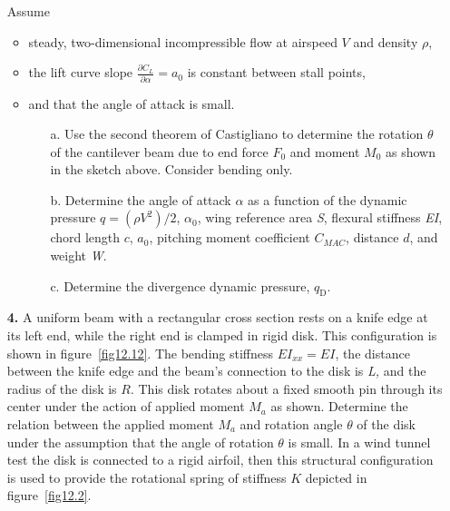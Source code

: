 \documentclass{AeroStructure-ERJohnson}
\begin{document}
\begin{exercise}
\begin{enumerate}[\textbf{2.}]
Assume
\begin{itemize}
  \item steady, two-dimensional incompressible flow at airspeed $V$ and density $\rho$,
  \item the lift curve slope $\frac{\partial C_{L}}{\partial \alpha}=a_{0}$ is constant between stall points,
  \item and that the angle of attack is small.
\begin{enumerate}[b.]
\item[\hspace*{-5.3pt}a.] Use the second theorem of Castigliano to determine the rotation $\theta$ of the cantilever beam due to end force $F_{0}$ and moment $M_{0}$ as shown in the sketch above. Consider bending only\vadjust{\vspace*{8pt}\pagebreak}.
  \item[\hspace*{-5.3pt}b.] Determine the angle of attack $\alpha$ as a function of the dynamic pressure $q=\left(\rho V^{2}\right) / 2$, $\alpha_{0}$, wing reference area \textit{S}, flexural stiffness \textit{EI}, chord length $c$, $a_{0}$, pitching moment coefficient $C_{\textit{MAC}}$, distance $d$, and weight \textit{W}.
  \item[\hspace*{-5.3pt}c.] Determine the divergence dynamic pressure, $q_{\mathrm{D}}$.
\end{enumerate}
\end{itemize}



\item[\textbf{4.}] A uniform beam with a rectangular cross section rests on a knife edge at its left end, while the right end is clamped in rigid disk. This configuration is shown in figure~\ref{fig12.12}. The bending stiffness $E I_{x x}=E I$, the distance between the knife edge and the beam's connection to the disk is \textit{L,} and the radius of the disk is $R$. This disk rotates about a fixed smooth pin through its center under the action of applied moment $M_a$ as shown. Determine the relation between the applied moment ${M_a}$ and rotation angle $\theta$ of the disk under the assumption that the angle of rotation $\theta$ is small. In a wind tunnel test the disk is connected to a rigid airfoil, then this structural configuration is used to provide the rotational spring of stiffness $K$ depicted in figure~\ref{fig12.2}.


\end{enumerate}
\end{exercise}
\end{document}
